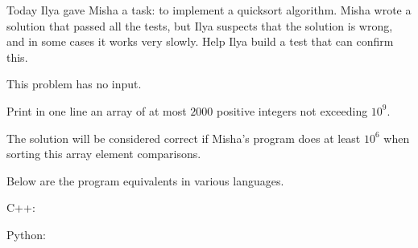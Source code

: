 \documentclass[a4paper]{article}
\begin{document}
Today Ilya gave Misha a task: to implement a quicksort algorithm. Misha wrote a solution that passed all the tests, but Ilya suspects that the solution is wrong, and in some cases it works very slowly. Help Ilya build a test that can confirm this.

This problem has no input.

Print in one line an array of at most $2000$ positive integers not exceeding $10^9$.

The solution will be considered correct if Misha's program does at least $10^6$ when sorting this array element comparisons.

Below are the program equivalents in various languages.

\SPACE

\noindent C++:


\SPACE

\noindent Python:


\end{document}
